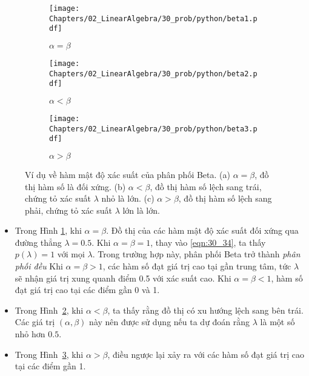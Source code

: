 \begin{figure}[t]
    \begin{subfigure}{0.325\textwidth}
    \texttt{[image: Chapters/02\_LinearAlgebra/30\_prob/python/beta1.pdf]}
    \caption{$\alpha = \beta$}
    \label{fig:30_3a}
    \end{subfigure}
    \begin{subfigure}{0.325\textwidth}
    \texttt{[image: Chapters/02\_LinearAlgebra/30\_prob/python/beta2.pdf]}
    \caption{$\alpha < \beta$}
    \label{fig:30_3b}
    \end{subfigure}
    \begin{subfigure}{0.325\textwidth}
    \texttt{[image: Chapters/02\_LinearAlgebra/30\_prob/python/beta3.pdf]}
    \caption{$\alpha > \beta$}
    \label{fig:30_3c}
    \end{subfigure}
    \caption{
    Ví dụ về hàm mật độ xác suất của phân phối Beta. (a) $\alpha = \beta$, đồ thị
    hàm số là đối xứng. (b) $\alpha < \beta$, đồ thị hàm số lệch sang trái, chứng tỏ xác suất $\lambda$ nhỏ là lớn. (c) $\alpha > \beta$, đồ thị hàm số lệch sang phải, chứng tỏ xác suất $\lambda$ lớn là lớn.
    }
    \label{fig:30_3}
\end{figure}

\begin{itemize}

    \item Trong Hình \ref{fig:30_3a}, khi $\alpha =\beta$. Đồ thị của các hàm
    mật độ xác suất đối xứng qua đường thẳng $\lambda = 0.5$. Khi $\alpha =
    \beta = 1$, thay vào \eqref{eqn:30_34}, ta thấy $p(\lambda) = 1$ với mọi
    $\lambda$. Trong trường hợp này, phân phối Beta trở thành \textit{phân phối
    đều} Khi $\alpha = \beta > 1$, các hàm số đạt giá trị cao tại gần trung tâm,
    tức $\lambda$ sẽ nhận giá trị xung quanh điểm 0.5 với xác suất cao. Khi
    $\alpha = \beta < 1$, hàm số đạt giá trị cao tại các điểm gần 0 và 1.    %

    \item Trong Hình~\ref{fig:30_3b}, khi $\alpha < \beta$, ta thấy rằng đồ thị
    có xu hướng lệch sang bên trái. Các giá trị $(\alpha, \beta)$ này nên được
    sử dụng nếu ta dự đoán rằng $\lambda$ là một số nhỏ hơn $0.5$.

    \item Trong Hình~\ref{fig:30_3c}, khi $\alpha > \beta$, điều ngược lại xảy
    ra với các hàm số đạt giá trị cao tại các điểm gần 1.
\end{itemize}


